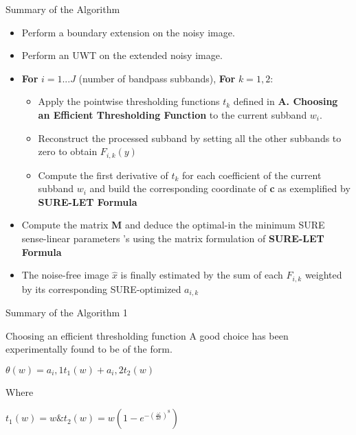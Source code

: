 \documentclass{beamer}
\begin{document}
\begin{frame}{Summary of the Algorithm}
\begin{itemize}
	\item Perform a boundary extension on the noisy image.
	\item Perform an UWT on the extended noisy image.
	\item \textbf{For} $i=1...J$ (number of bandpass subbands), \textbf{For} $k=1,2:$
	\begin{itemize}
		\item Apply the pointwise thresholding functions $t_k$ defined
		in \textbf{A. Choosing an Efficient Thresholding Function} to the current subband $w_i$.
\item Reconstruct the processed subband by setting all the
other subbands to zero to obtain $F_{i,k}(y)$	
\item Compute the first derivative of $t_k$ for each coefficient
of the current subband $w_i$ and build the corresponding
coordinate of \textbf{c} as exemplified by \textbf{SURE-LET Formula}
\end{itemize}
	
	\item Compute the matrix \textbf{M} and deduce the optimal-in the
	minimum SURE sense-linear parameters ’s using the
	matrix formulation of \textbf{SURE-LET Formula}
	\item  The noise-free image $\hat{x}$ is finally estimated by the sum of
	each $F_{i,k}$ weighted by its corresponding SURE-optimized $a_{i,k}$
\end{itemize}
\end{frame}
\begin{frame}{Summary of the Algorithm 1}
\begin{block}{Choosing an efficient thresholding function}
A good choice has been experimentally found to be of the form.
\begin{center}
	$\theta(w)=a_i,1{t_1}(w)+a_i,2{t_2}(w)$
	
\end{center}
\end{block}

\begin{block}{Where}
	\begin{center}
		$t_1(w)=w \& t_2(w)=w\left(1-e^{-(\frac{\omega}{3\sigma})}^8 \right)$
	\end{center}
\end{block}
	
\end{frame}
	
\end{document}
